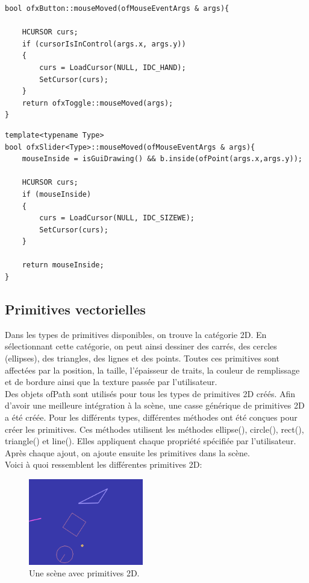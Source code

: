 \begin{lstlisting}
bool ofxButton::mouseMoved(ofMouseEventArgs & args){

	HCURSOR curs;
	if (cursorIsInControl(args.x, args.y))
	{
		curs = LoadCursor(NULL, IDC_HAND);
		SetCursor(curs);
	}
	return ofxToggle::mouseMoved(args);
}
\end{lstlisting}

\begin{lstlisting}
template<typename Type>
bool ofxSlider<Type>::mouseMoved(ofMouseEventArgs & args){
	mouseInside = isGuiDrawing() && b.inside(ofPoint(args.x,args.y));
	
	HCURSOR curs;
	if (mouseInside)
	{
		curs = LoadCursor(NULL, IDC_SIZEWE);
		SetCursor(curs);
	}
	
	return mouseInside;
}
\end{lstlisting}

\subsection{Primitives vectorielles}

Dans les types de primitives disponibles, on trouve la catégorie 2D. En sélectionnant cette catégorie, on peut ainsi dessiner des carrés, des cercles (ellipses), des triangles, des lignes et des points. Toutes ces primitives sont affectées par la position, la taille, l’épaisseur de traits, la couleur de remplissage et de bordure ainsi que la texture passée par l’utilisateur.\\

Des objets ofPath sont utilisés pour tous les types de primitives 2D créés. Afin d’avoir une meilleure intégration à la scène, une casse générique de primitives 2D a été créée. Pour les différents types, différentes méthodes ont été conçues pour créer les primitives. Ces méthodes utilisent les méthodes ellipse(), circle(), rect(), triangle() et line(). Elles appliquent chaque propriété spécifiée par l’utilisateur. Après chaque ajout, on ajoute ensuite les primitives dans la scène.\\

Voici à quoi ressemblent les différentes primitives 2D:\\
\begin{figure}[h]
	\centering
	\includegraphics[width=5cm]{fig/primitives2d.png}
	\caption{Une scène avec primitives 2D.}
	\label{fig:prim2D}
\end{figure}

